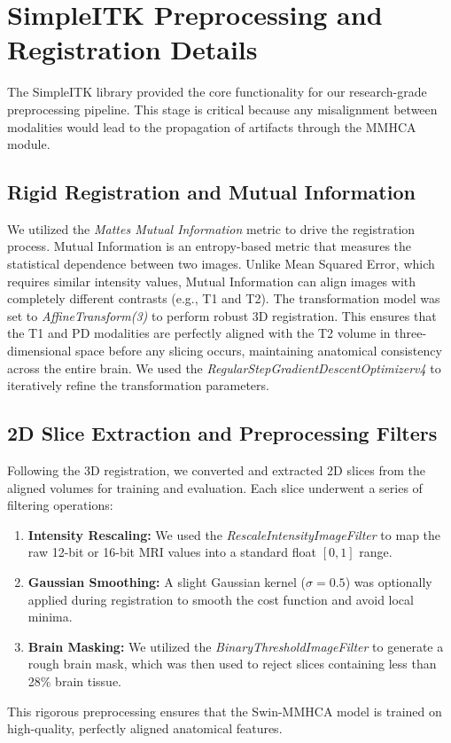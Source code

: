 \section{SimpleITK Preprocessing and Registration Details}
The SimpleITK library provided the core functionality for our research-grade preprocessing pipeline. This stage is critical because any misalignment between modalities would lead to the propagation of artifacts through the MMHCA module.

\subsection{Rigid Registration and Mutual Information}
We utilized the \textit{Mattes Mutual Information} metric to drive the registration process. Mutual Information is an entropy-based metric that measures the statistical dependence between two images. Unlike Mean Squared Error, which requires similar intensity values, Mutual Information can align images with completely different contrasts (e.g., T1 and T2).
The transformation model was set to \textit{AffineTransform(3)} to perform robust 3D registration. This ensures that the T1 and PD modalities are perfectly aligned with the T2 volume in three-dimensional space before any slicing occurs, maintaining anatomical consistency across the entire brain. We used the \textit{RegularStepGradientDescentOptimizerv4} to iteratively refine the transformation parameters.

\subsection{2D Slice Extraction and Preprocessing Filters}
Following the 3D registration, we converted and extracted 2D slices from the aligned volumes for training and evaluation. Each slice underwent a series of filtering operations:
\begin{enumerate}
    \item \textbf{Intensity Rescaling:} We used the \textit{RescaleIntensityImageFilter} to map the raw 12-bit or 16-bit MRI values into a standard float $[0, 1]$ range.
    \item \textbf{Gaussian Smoothing:} A slight Gaussian kernel ($\sigma = 0.5$) was optionally applied during registration to smooth the cost function and avoid local minima.
    \item \textbf{Brain Masking:} We utilized the \textit{BinaryThresholdImageFilter} to generate a rough brain mask, which was then used to reject slices containing less than 28\% brain tissue.
\end{enumerate}
This rigorous preprocessing ensures that the Swin-MMHCA model is trained on high-quality, perfectly aligned anatomical features.

